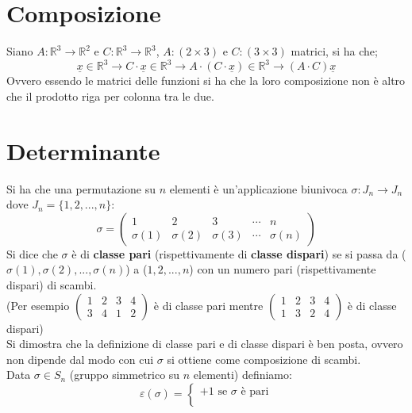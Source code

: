 \documentclass[a4paper,12pt, oneside]{book}
\begin{document}
\section{Composizione}
Siano $A:\mathbb{R}^3\rightarrow \mathbb{R}^2$ e $C:\mathbb{R}^3\rightarrow \mathbb{R}^3$, $A:(2\times 3)$ e $C:(3\times 3)$ matrici, si ha che;
$$\underline{x}	\in\mathbb{R}^3\rightarrow C\cdot\underline{x}	\in\mathbb{R}^3\rightarrow A\cdot(C\cdot\underline{x})	\in\mathbb{R}^3\rightarrow (A\cdot C)\underline{x}$$
Ovvero essendo le matrici delle funzioni si ha che la loro composizione non è altro che il prodotto riga per colonna tra le due.
\section{Determinante}
\begin{shaded}
	\begin{definizione}[bonus]
		Si ha che una permutazione su $n$ elementi è un'applicazione biunivoca $\sigma:J_n\rightarrow J_n$ dove $J_n=\{1,2,...,n\}$:
		$$
			\sigma=\left(\begin{matrix}
					1         & 2         & 3         & \cdots & n         \\
					\sigma(1) & \sigma(2) & \sigma(3) & \cdots & \sigma(n)
				\end{matrix}\right)
		$$
		Si dice che $\sigma$ è di \textbf{classe pari} (rispettivamente di \textbf{classe dispari}) se si passa da ($\sigma(1),\sigma(2),...,\sigma(n)$) a ($1,2,...,n$) con un numero pari (rispettivamente dispari) di scambi.\\
		(Per esempio
		$
			\left(\begin{matrix}
					1 & 2 & 3 & 4 \\
					3 & 4 & 1 & 2
				\end{matrix}\right)
		$ è di classe pari mentre $
			\left(\begin{matrix}
					1 & 2 & 3 & 4 \\
					1 & 3 & 2 & 4
				\end{matrix}\right)
		$ è di classe dispari)\\
		Si dimostra che la definizione di classe pari e di classe dispari è ben posta, ovvero non dipende dal modo con cui $\sigma$ si ottiene come composizione di scambi.\\
		Data $\sigma\in S_n$ (gruppo simmetrico su $n$ elementi) definiamo:
		$$\varepsilon(\sigma)=\begin{cases}
				+1  \mbox{   se } \sigma \mbox{ è pari} \\

\end{cases}$$
\end{definizione}
\end{shaded}
\end{document}
